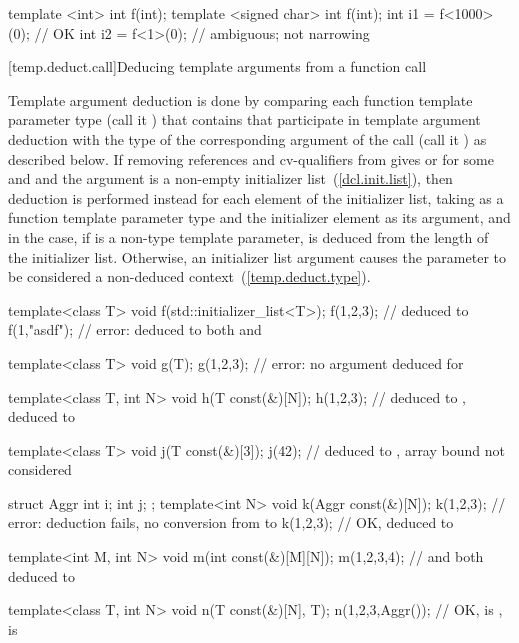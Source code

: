 \begin{codeblock}
template <int> int f(int);
template <signed char> int f(int);
int i1 = f<1000>(0);         // OK
int i2 = f<1>(0);            // ambiguous; not narrowing
\end{codeblock}
\exitexample

[temp.deduct.call]{Deducing template arguments from a function call}

\pnum
Template argument deduction is done by comparing each function
template parameter type (call it
)
that contains  that participate in template argument deduction
with the type of the corresponding argument of the call (call it
)
as described below.
If removing references and cv-qualifiers from  gives
or 
for some  and  and the
argument is a non-empty initializer list~(\ref{dcl.init.list}), then deduction is
performed instead for each element of the initializer list, taking
 as a function template parameter type and the initializer
element as its argument,
and in the  case, if  is a non-type template parameter,
 is deduced from the length of the initializer list.
Otherwise, an initializer list argument causes the
parameter to be considered a non-deduced context~(\ref{temp.deduct.type}).
\enterexample
\begin{codeblock}
template<class T> void f(std::initializer_list<T>);
f({1,2,3});                 //  deduced to 
f({1,"asdf"});              // error:  deduced to both  and 

template<class T> void g(T);
g({1,2,3});                 // error: no argument deduced for 

template<class T, int N> void h(T const(&)[N]);
h({1,2,3});                 //  deduced to ,  deduced to 

template<class T> void j(T const(&)[3]);
j({42});                    //  deduced to , array bound not considered

struct Aggr { int i; int j; };
template<int N> void k(Aggr const(&)[N]);
k({1,2,3});                 // error: deduction fails, no conversion from  to 
k({{1},{2},{3}});           // OK,  deduced to 

template<int M, int N> void m(int const(&)[M][N]);
m({{1,2},{3,4}});           //  and  both deduced to 

template<class T, int N> void n(T const(&)[N], T);
n({{1},{2},{3}},Aggr());    // OK,  is ,  is 
\end{codeblock}
